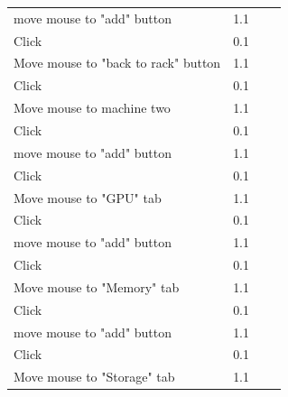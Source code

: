 \documentclass[11pt]{article}
\begin{document}
\begin{table}[]
{\begin{tabular}{lrlr}
					move mouse to "add" button               & 1.1       &                                                 &     \\
					Click                                    & 0.1       &                                                 &     \\
					Move mouse to "back to rack" button      & 1.1       &                                                 &     \\
					Click                                    & 0.1       &                                                 &     \\
					Move mouse to machine two                & 1.1       &                                                 &     \\
					Click                                    & 0.1       &                                                 &     \\
					move mouse to "add" button               & 1.1       &                                                 &     \\
					Click                                    & 0.1       &                                                 &     \\
					Move mouse to "GPU" tab                  & 1.1       &                                                 &     \\
					Click                                    & 0.1       &                                                 &     \\
					move mouse to "add" button               & 1.1       &                                                 &     \\
					Click                                    & 0.1       &                                                 &     \\
					Move mouse to "Memory" tab               & 1.1       &                                                 &     \\
					Click                                    & 0.1       &                                                 &     \\
					move mouse to "add" button               & 1.1       &                                                 &     \\
					Click                                    & 0.1       &                                                 &     \\
					Move mouse to "Storage" tab              & 1.1       &                                                 &     \\

\end{tabular}}
\end{table}
\end{document}
